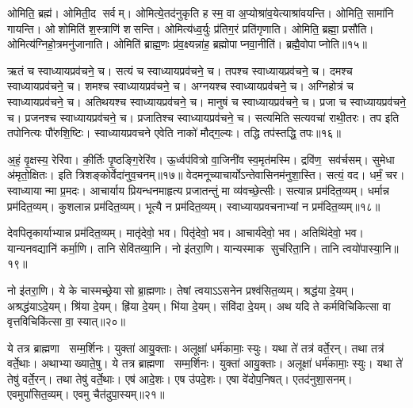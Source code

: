 ओमिति॒ ब्रह्म॑। ओमिती॒द सर्वम्। ओमित्ये॒तद॑नुकृति ह स्म॒ वा अ॒प्योश्रा॑व॒येत्याश्रा॑वयन्ति। ओमिति॒ सामा॑नि गायन्ति। ओशोमिति॑ श॒स्त्राणि॑ शसन्ति। ओमित्य॑ध्व॒र्युः प्र॑तिग॒रं प्रति॑गृणाति। ओमिति॒ ब्रह्मा॒ प्रसौ॑ति। ओमित्य॑ग्निहो॒त्रमनु॑जानाति। ओमिति॑ ब्राह्म॒णः प्र॑व॒क्ष्यन्ना॑ह॒ ब्रह्मोपाप्नवा॒नीति॑। ब्रह्मै॒वो\-पाप्नोति॥१५॥
\anuvakamend[ओन्दश॑]

ऋतं च स्वाध्यायप्रव॑चने॒ च। सत्यं च स्वाध्यायप्रव॑चने॒ च। तपश्च स्वाध्यायप्रव॑चने॒ च। दमश्च स्वाध्यायप्रव॑चने॒ च। शमश्च स्वाध्यायप्रव॑चने॒ च। अग्नयश्च स्वाध्यायप्रव॑चने॒ च। अग्निहोत्रं च स्वाध्यायप्रव॑चने॒ च। अतिथयश्च स्वाध्यायप्रव॑चने॒ च। मानुषं च स्वाध्यायप्रव॑चने॒ च। प्रजा च स्वाध्यायप्रव॑चने॒ च। प्रजनश्च स्वाध्यायप्रव॑चने॒ च। प्रजातिश्च स्वाध्यायप्रव॑चने॒ च। सत्यमिति सत्यवचा॑ राथी॒तरः। तप इति तपोनित्यः पौ॑रुशि॒ष्टिः। स्वाध्यायप्रवचने एवेति नाको॑ मौद्ग॒ल्यः। तद्धि तप॑स्तद्धि॒ तपः॥१६॥
\anuvakamend[प्रजा च स्वाध्यायप्रव॑चने॒ च षट्च॑]

अ॒हं॒ वृ॒क्षस्य॒ रेरि॑वा। की॒र्तिः पृ॒ष्ठङ्गि॒रेरि॑व। ऊ॒र्ध्वप॑वित्रो वा॒जिनी॑व स्व॒मृत॑मस्मि। द्रवि॑ण॒ सव॑र्चसम्। सुमेधा अ॑मृतो॒क्षितः। इति त्रिशङ्कोर्वेदा॑नुव॒चनम्॥१७॥
\anuvakamend[अ॒ह षट्]
वेदमनूच्याचार्योऽन्तेवासिनम॑नुशा॒स्ति। सत्यं॒ वद। धर्मं॒ चर। स्वाध्यायान्मा प्र॒मदः। आचार्याय प्रियन्धनमाहृत्य प्रजातन्तुं मा व्य॑वच्छे॒त्सीः। सत्यान्न प्रम॑दित॒व्यम्। धर्मान्न प्रम॑दित॒व्यम्। कुशलान्न प्रम॑दित॒व्यम्। भूत्यै न प्रम॑दित॒व्यम्। स्वाध्यायप्रवचनाभ्यां न प्रम॑दित॒व्यम्॥१८॥

देवपितृकार्याभ्यान्न प्रम॑दित॒व्यम्। मातृ॑देवो॒ भव। पितृ॑देवो॒ भव। आचार्य॑देवो॒ भव। अतिथि॑देवो॒ भव। यान्यनवद्यानि॑ कर्मा॒णि। तानि सेवि॑तव्या॒नि। नो इ॑तरा॒णि। यान्यस्माक सुच॑रिता॒नि। तानि त्वयो॑पास्या॒नि॥१९॥

नो इ॑तरा॒णि। ये के चास्मच्छ्रेयासो ब्रा॒ह्मणाः। तेषां त्वयाऽऽसनेन प्रश्व॑सित॒व्यम्। श्रद्ध॑या दे॒यम्। अश्रद्ध॑याऽदे॒यम्। श्रि॑या दे॒यम्। ह्रि॑या दे॒यम्। भि॑या दे॒यम्। संवि॑दा दे॒यम्। अथ यदि ते कर्मविचिकित्सा वा वृत्तविचिकि॑त्सा वा॒ स्यात्॥२०॥

ये तत्र ब्राह्मणा सम्म॒र्\mbox{}शिनः। युक्ता॑ आयु॒क्ताः। अलूक्षा॑ धर्म॑कामाः॒ स्युः। यथा ते॑ तत्र॑ वर्ते॒रन्। तथा तत्र॑ वर्ते॒थाः। अथाभ्याख्याते॒षु। ये तत्र ब्राह्मणा सम्म॒र्\mbox{}शिनः। युक्ता॑ आयु॒क्ताः। अलूक्षा॑ धर्म॑कामाः॒ स्युः। यथा ते॑ तेषु॑ वर्ते॒रन्। तथा तेषु॑ वर्ते॒थाः। एष॑ आदे॒शः। एष उ॑पदे॒शः। एषा वे॑दोप॒निषत्। एतद॑नुशा॒सनम्। एवमुपा॑सित॒व्यम्। एवमु चैत॑दुपा॒स्यम्॥२१॥
\anuvakamend[स्वाध्यायप्रवचनाभ्यान्न प्रम॑दित॒व्यं तानि त्वयो॑पास्या॒नि स्यात्तेषु॑ वर्ते॒रन्त्स॒प्त च॑]

